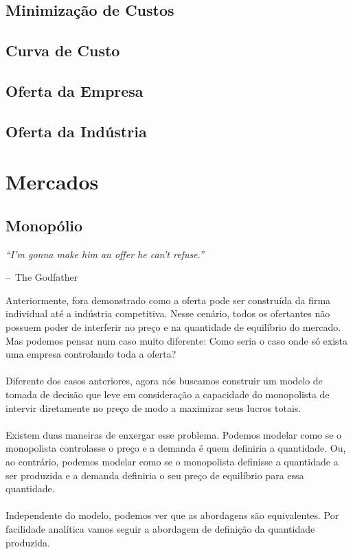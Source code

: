 \documentclass[a4paper,11pt,oneside]{book}
\makeatletter
\theoremstyle{definition}
\theoremstyle{break}
\newenvironment{chapquote}[2][2em]
  {\setlength{\@tempdima}{#1}%
   \def\chapquote@author{#2}%
   \parshape 1 \@tempdima \dimexpr\textwidth-2\@tempdima\relax%
   \itshape}
  {\par\normalfont\hfill--\ \chapquote@author\hspace*{\@tempdima}\par\bigskip}
\makeatother
\begin{document}
\chapter{Minimização de Custos}

\chapter{Curva de Custo}

\chapter{Oferta da Empresa}

\chapter{Oferta da Indústria}

\part{Mercados}

\chapter{Monopólio}

\begin{chapquote}{The Godfather}
	``I'm gonna make him an offer he can't refuse.''
\end{chapquote}

Anteriormente, fora demonstrado como a oferta pode ser construída da firma individual até a indústria competitiva. Nesse cenário, todos os ofertantes não possuem poder de interferir no preço e na quantidade de equilíbrio do mercado. Mas podemos pensar num caso muito diferente: Como seria o caso onde só exista uma empresa controlando toda a oferta?
\\
\\
Diferente dos casos anteriores, agora nós buscamos construir um modelo de tomada de decisão que leve em consideração a capacidade do monopolista de intervir diretamente no preço de modo a maximizar seus lucros totais.
\\
\\
Existem duas maneiras de enxergar esse problema. Podemos modelar como se o monopolista controlasse o preço e a demanda é quem definiria a quantidade. Ou, ao contrário, podemos modelar como se o monopolista definisse a quantidade a ser produzida e a demanda definiria o seu preço de equilíbrio para essa quantidade.
\\
\\
Independente do modelo, podemos ver que as abordagens são equivalentes. Por facilidade analítica vamos seguir a abordagem de definição da quantidade produzida.
\end{document}
